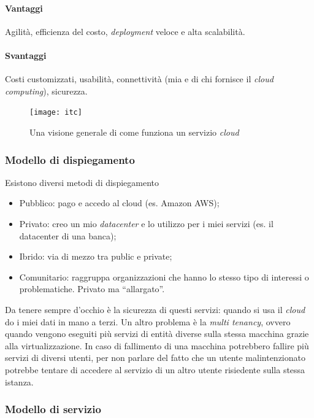 \paragraph*{Vantaggi} Agilità, efficienza del costo, \textit{deployment} veloce
e alta scalabilità.

\paragraph*{Svantaggi} Costi customizzati, usabilità, connettività (mia e di
chi fornisce il \textit{cloud computing}), sicurezza.


\begin{figure}[H]
 \centering
 \texttt{[image: itc]}
 \caption{Una visione generale di come funziona un servizio \textit{cloud}}
\end{figure}

\subsubsection{Modello di dispiegamento}

Esistono diversi metodi di dispiegamento
\begin{itemize}
  \item Pubblico: pago e accedo al cloud (es. Amazon AWS);
  \item Privato: creo un mio \textit{datacenter} e lo utilizzo per i miei
  servizi (es. il datacenter di una banca);
  \item Ibrido: via di mezzo tra public e private;
  \item Comunitario: raggruppa organizzazioni che hanno lo stesso tipo di
  interessi o problematiche. Privato ma ``allargato''.
\end{itemize}

Da tenere sempre d'occhio è la sicurezza di questi servizi: quando si usa il
\textit{cloud} do i miei dati in mano a terzi. Un altro problema è la
\textit{multi tenancy}, ovvero quando vengono eseguiti più servizi di entità
diverse sulla stessa macchina grazie alla virtualizzazione. In caso di
fallimento di una macchina potrebbero fallire più servizi di diversi utenti,
per non parlare del fatto che un utente malintenzionato potrebbe tentare di
accedere al servizio di un altro utente risiedente sulla stessa istanza.

\subsubsection{Modello di servizio}

